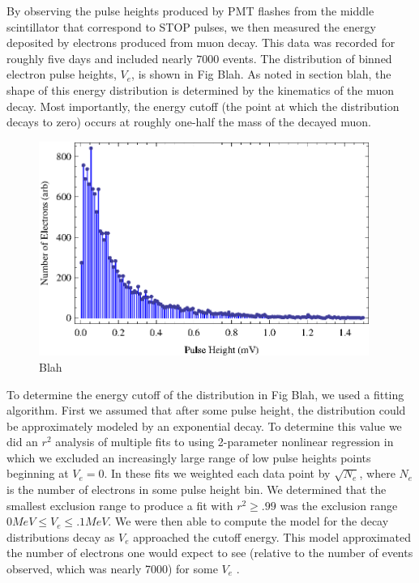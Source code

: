 By observing the pulse heights produced by PMT flashes from the middle
scintillator that correspond to STOP pulses, we then measured the
energy deposited by electrons produced from muon decay.  This data was
recorded for roughly five days and included nearly $7000$ events.  The
distribution of binned electron pulse heights, $V_{e}$, is shown in
Fig Blah.  As noted in section blah, the shape of this energy
distribution is determined by the kinematics of the muon decay.  Most
importantly, the energy cutoff (the point at which the distribution
decays to zero) occurs at roughly one-half the mass of the decayed
muon.


\begin{figure}[htbp]
\begin{center}
\includegraphics[height=70mm]{./figures/Electron_Energy_Cutoff.eps}
\caption{Blah}
\label{figure:logic}
\end{center}
\end{figure}

To determine the energy cutoff of the distribution in Fig Blah, we
used a fitting algorithm.  First we assumed that after some pulse
height, the distribution could be approximately modeled by an
exponential decay.  To determine this value we did an $r^{2}$ analysis
of multiple fits to using 2-parameter nonlinear regression in which we
excluded an increasingly large range of low pulse heights points
beginning at $V_{e}=0$.  In these fits we weighted each data point by
$\sqrt{N_{e}}$, where $N_{e}$ is the number of electrons in some pulse
height bin.  We determined that the smallest exclusion range to
produce a fit with $r^{2}\geq.99$ was the exclusion range $0 MeV \leq
V_{e}\leq .1 MeV$.  We were then able to compute the model for the
decay distributions decay as $V_{e}$ approached the cutoff energy.
This model approximated the number of electrons one would expect to
see (relative to the number of events observed, which was nearly 7000)
for some $V_{e}$ .

